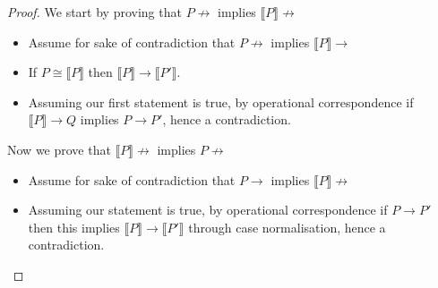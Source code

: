\begin{proof}
We start by proving that $P \not \rightarrow$ implies $\llbracket P \rrbracket \not \rightarrow$

\begin{itemize}
    \item Assume for sake of contradiction that $P \not \rightarrow$ implies $\llbracket P \rrbracket \rightarrow$
    \item If $P \cong \llbracket P \rrbracket$ then $\llbracket P \rrbracket \rightarrow \llbracket P' \rrbracket$.
    \item Assuming our first statement is true, by operational correspondence if $\llbracket P \rrbracket \rightarrow Q$ implies $P \rightarrow P'$, hence a contradiction. 
\end{itemize}

Now we prove that $\llbracket P \rrbracket \not \rightarrow$ implies $P \not \rightarrow$
\begin{itemize}
    \item Assume for sake of contradiction that $P \rightarrow$ implies $\llbracket P \rrbracket \not \rightarrow$
    \item Assuming our statement is true, by operational correspondence if $P \rightarrow P'$ then this implies $\llbracket P \rrbracket \rightarrow \llbracket P' \rrbracket$ through case normalisation, hence a contradiction.
\end{itemize}
\end{proof}






\vspace{10pt}

